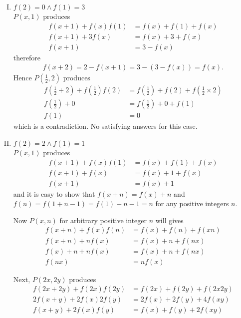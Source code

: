 \begin{solusi}
\begin{enumerate}[I.]
        \item $f(2)=0 \wedge f(1)=3$\\
        $P(x,1)$ produces
        \begin{align*}
            f(x+1)+f(x)f(1) &= f(x)+f(1)+f(x)\\
            f(x+1)+3f(x) &= f(x)+3+f(x)\\
            f(x+1) &= 3-f(x)
        \end{align*}
        therefore 
        \begin{align*}
            f(x+2) = 2 - f(x+1) = 3-(3-f(x)) = f(x).
        \end{align*}
        Hence $P(\frac{1}{2}, 2)$ produces
        \begin{align*}
            f(\frac{1}{2}+2) + f(\frac{1}{2})f(2) &= f(\frac{1}{2})+f(2)+f(\frac{1}{2}\times2)\\
            f(\frac{1}{2}) + 0 &= f(\frac{1}{2}) + 0 +f(1)\\
            f(1) &= 0
        \end{align*}
        which is a contradiction. No satisfying answers for this case.
        
        \item $f(2)=2 \wedge f(1)=1$\\
        $P(x,1)$ produces
        \begin{align*}
            f(x+1)+f(x)f(1) &= f(x)+f(1)+f(x)\\
            f(x+1)+f(x) &= f(x)+1+f(x)\\
            f(x+1) &= f(x) + 1
        \end{align*}
        and it is easy to show that $f(x+n)=f(x)+n$ and $f(n)=f(1+n-1)=f(1)+n-1=n$ for any positive integers $n$.

        Now $P(x,n)$ for arbitrary positive integer $n$ will gives
        \begin{align*}
            f(x+n)+f(x)f(n) &= f(x)+f(n)+f(xn)\\
            f(x+n)+nf(x) &= f(x)+n+f(nx)\\
            f(x)+n+nf(x) &= f(x)+n+f(nx)\\
            f(nx) &= nf(x)
        \end{align*}

        Next, $P(2x,2y)$ produces
        \begin{align*}
            f(2x+2y)+f(2x)f(2y) &= f(2x)+f(2y)+f(2x2y)\\
            2f(x+y)+2f(x)2f(y) &= 2f(x)+2f(y)+4f(xy)\\
            f(x+y)+2f(x)f(y) &= f(x)+f(y)+2f(xy)
        \end{align*}


\end{enumerate}
\end{solusi}
